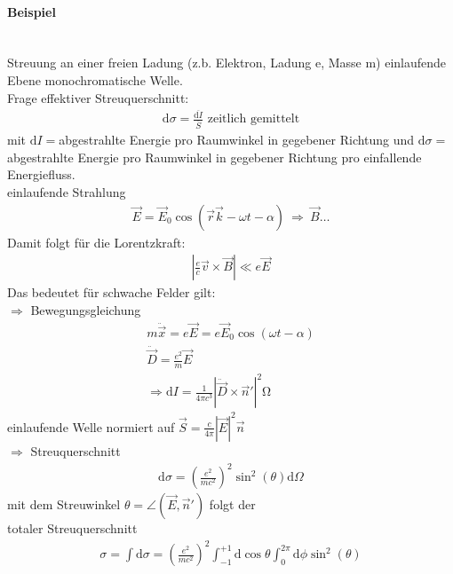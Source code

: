 \documentclass[a4paper]{article}
\begin{document}
\paragraph{Beispiel}~
\\
Streuung an einer freien Ladung (z.b. Elektron, Ladung e, Masse m) einlaufende
Ebene monochromatische Welle.\\
Frage effektiver Streuquerschnitt:
\begin{align}
\mathrm{d}\sigma=\frac{\overline{\mathrm{d}I}}{\overline{S}} \text{  zeitlich
gemittelt}
\end{align}
mit $\mathrm{d}I=$abgestrahlte Energie pro Raumwinkel in gegebener Richtung und
$\mathrm{d}\sigma=$abgestrahlte Energie pro Raumwinkel in gegebener Richtung pro
einfallende Energiefluss.\\
einlaufende Strahlung
\begin{align}
\vec{E}=\vec{E}_0 \cos(\vec{r}\vec{k}-\omega t -\alpha)\ \Rightarrow\ 
\vec{B}\ldots
\end{align}
Damit folgt für die Lorentzkraft:
\begin{align}
\left| \frac{e}{c}\vec{v}\times\vec{B}\right|\ll e\vec{E}
\end{align}
Das bedeutet für schwache Felder gilt:\\
$\Rightarrow$ Bewegungsgleichung
\begin{align}
m\ddot{\vec{x}}=e\vec{E}=e\vec{E}_0 \cos(\omega t -\alpha)\\
\ddot{\vec{D}}=\frac{e^2}{m}\vec{E}\\
\Rightarrow \mathrm{d}I=\frac{1}{4\pi c^3}\left|
\ddot{\vec{D}}\times\vec{n}' \right|^2 \mathrm{\Omega}
\end{align}
einlaufende Welle normiert auf $\vec{S}=\frac{c}{4\pi}|\vec{E}|^2\vec{n}$\\
$\Rightarrow$ Streuquerschnitt\\
\begin{align}
\mathrm{d}\sigma = \left(\frac{e^2}{mc^2} \right)^2 \sin^2(\theta)
\mathrm{d}\Omega
\end{align}
mit dem Streuwinkel $\theta=\angle(\vec{E},\vec{n}')$ folgt der\\
totaler Streuquerschnitt
\begin{align}
\sigma=\int\mathrm{d}\sigma=\left(\frac{e^2}{mc^2} \right)^2\int_{-1}^{+1}
\mathrm{d}\cos\theta \int_0^{2\pi}\mathrm{d}\phi \sin^2(\theta)
\end{align}
\end{document}
